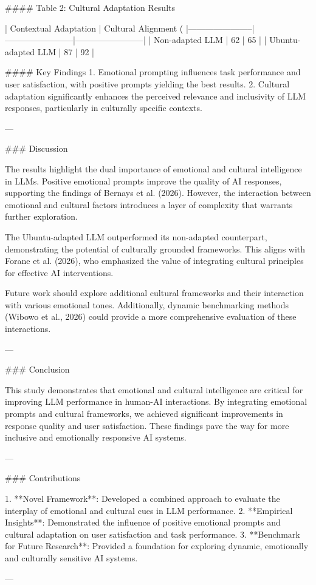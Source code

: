 #### Table 2: Cultural Adaptation Results  

| Contextual Adaptation | Cultural Alignment (%
|-----------------------|------------------------|------------------------|  
| Non-adapted LLM       | 62                     | 65                     |  
| Ubuntu-adapted LLM    | 87                     | 92                     |  

#### Key Findings
1. Emotional prompting influences task performance and user satisfaction, with positive prompts yielding the best results.
2. Cultural adaptation significantly enhances the perceived relevance and inclusivity of LLM responses, particularly in culturally specific contexts.

---

### Discussion  

The results highlight the dual importance of emotional and cultural intelligence in LLMs. Positive emotional prompts improve the quality of AI responses, supporting the findings of Bernays et al. (2026). However, the interaction between emotional and cultural factors introduces a layer of complexity that warrants further exploration.

The Ubuntu-adapted LLM outperformed its non-adapted counterpart, demonstrating the potential of culturally grounded frameworks. This aligns with Forane et al. (2026), who emphasized the value of integrating cultural principles for effective AI interventions.

Future work should explore additional cultural frameworks and their interaction with various emotional tones. Additionally, dynamic benchmarking methods (Wibowo et al., 2026) could provide a more comprehensive evaluation of these interactions.

---

### Conclusion

This study demonstrates that emotional and cultural intelligence are critical for improving LLM performance in human-AI interactions. By integrating emotional prompts and cultural frameworks, we achieved significant improvements in response quality and user satisfaction. These findings pave the way for more inclusive and emotionally responsive AI systems.

---

### Contributions

1. **Novel Framework**: Developed a combined approach to evaluate the interplay of emotional and cultural cues in LLM performance.
2. **Empirical Insights**: Demonstrated the influence of positive emotional prompts and cultural adaptation on user satisfaction and task performance.
3. **Benchmark for Future Research**: Provided a foundation for exploring dynamic, emotionally and culturally sensitive AI systems.

---